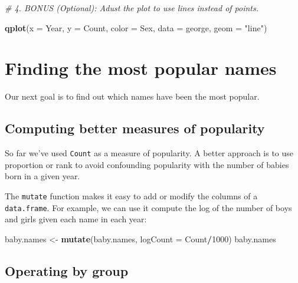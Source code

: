 \documentclass[]{book}
\newenvironment{Shaded}{\begin{snugshade}}{\end{snugshade}}
\newcommand{\KeywordTok}[1]{\textcolor[rgb]{0.13,0.29,0.53}{\textbf{#1}}}
\newcommand{\DataTypeTok}[1]{\textcolor[rgb]{0.13,0.29,0.53}{#1}}
\newcommand{\DecValTok}[1]{\textcolor[rgb]{0.00,0.00,0.81}{#1}}
\newcommand{\StringTok}[1]{\textcolor[rgb]{0.31,0.60,0.02}{#1}}
\newcommand{\CommentTok}[1]{\textcolor[rgb]{0.56,0.35,0.01}{\textit{#1}}}
\newcommand{\OperatorTok}[1]{\textcolor[rgb]{0.81,0.36,0.00}{\textbf{#1}}}
\newcommand{\NormalTok}[1]{#1}
\begin{document}
\begin{Shaded}
\begin{Highlighting}[]
\CommentTok{# 4.  BONUS (Optional): Adust the plot to use lines instead of points.}
\end{Highlighting}
\end{Shaded}

\begin{Shaded}
\begin{Highlighting}[]
\KeywordTok{qplot}\NormalTok{(}\DataTypeTok{x =}\NormalTok{ Year, }\DataTypeTok{y =}\NormalTok{ Count, }\DataTypeTok{color =}\NormalTok{ Sex, }\DataTypeTok{data =}\NormalTok{ george, }\DataTypeTok{geom =} \StringTok{"line"}\NormalTok{)}
\end{Highlighting}
\end{Shaded}

\chapter{Finding the most popular
names}\label{finding-the-most-popular-names}

Our next goal is to find out which names have been the most popular.

\section{Computing better measures of
popularity}\label{computing-better-measures-of-popularity}

So far we've used \texttt{Count} as a measure of popularity. A better
approach is to use proportion or rank to avoid confounding popularity
with the number of babies born in a given year.

The \texttt{mutate} function makes it easy to add or modify the columns
of a \texttt{data.frame}. For example, we can use it compute the log of
the number of boys and girls given each name in each year:

\begin{Shaded}
\begin{Highlighting}[]
\NormalTok{baby.names <-}\StringTok{ }\KeywordTok{mutate}\NormalTok{(baby.names, }\DataTypeTok{logCount =}\NormalTok{ Count}\OperatorTok{/}\DecValTok{1000}\NormalTok{)}
\NormalTok{baby.names}
\end{Highlighting}
\end{Shaded}

\section{Operating by group}\label{operating-by-group}
\end{document}
